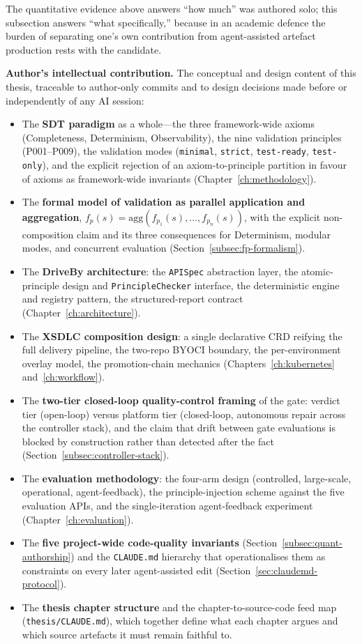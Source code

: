 The quantitative evidence above answers ``how much'' was authored solo; this subsection answers ``what specifically,'' because in an academic defence the burden of separating one's own contribution from agent-assisted artefact production rests with the candidate.

\textbf{Author's intellectual contribution.} The conceptual and design content of this thesis, traceable to author-only commits and to design decisions made before or independently of any AI session:

\begin{itemize}\setlength\itemsep{0.25em}
\item The \textbf{SDT paradigm} as a whole---the three framework-wide axioms (Completeness, Determinism, Observability), the nine validation principles (P001--P009), the validation modes (\texttt{minimal}, \texttt{strict}, \texttt{test-ready}, \texttt{test-only}), and the explicit rejection of an axiom-to-principle partition in favour of axioms as framework-wide invariants (Chapter~\ref{ch:methodology}).
\item The \textbf{formal model of validation as parallel application and aggregation}, $f_p(s) = \mathrm{agg}(f_{p_1}(s), \dots, f_{p_n}(s))$, with the explicit non-composition claim and its three consequences for Determinism, modular modes, and concurrent evaluation (Section~\ref{subsec:fp-formalism}).
\item The \textbf{DriveBy architecture}: the \texttt{APISpec} abstraction layer, the atomic-principle design and \texttt{PrincipleChecker} interface, the deterministic engine and registry pattern, the structured-report contract (Chapter~\ref{ch:architecture}).
\item The \textbf{XSDLC composition design}: a single declarative CRD reifying the full delivery pipeline, the two-repo BYOCI boundary, the per-environment overlay model, the promotion-chain mechanics (Chapters~\ref{ch:kubernetes} and~\ref{ch:workflow}).
\item The \textbf{two-tier closed-loop quality-control framing} of the gate: verdict tier (open-loop) versus platform tier (closed-loop, autonomous repair across the controller stack), and the claim that drift between gate evaluations is blocked by construction rather than detected after the fact (Section~\ref{subsec:controller-stack}).
\item The \textbf{evaluation methodology}: the four-arm design (controlled, large-scale, operational, agent-feedback), the principle-injection scheme against the five evaluation APIs, and the single-iteration agent-feedback experiment (Chapter~\ref{ch:evaluation}).
\item The \textbf{five project-wide code-quality invariants} (Section~\ref{subsec:quant-authorship}) and the \texttt{CLAUDE.md} hierarchy that operationalises them as constraints on every later agent-assisted edit (Section~\ref{sec:claudemd-protocol}).
\item The \textbf{thesis chapter structure} and the chapter-to-source-code feed map (\texttt{thesis/CLAUDE.md}), which together define what each chapter argues and which source artefacts it must remain faithful to.
\end{itemize}

